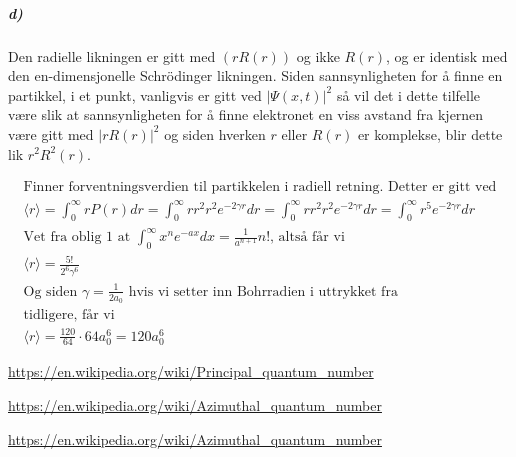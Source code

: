 \documentclass[11pt, A4paper,norsk]{article}
\begin{document}
			\subparagraph{d)}
				\begin{flushleft}
Den radielle likningen er gitt med $(r R(r))$ og ikke $R(r)$, og er identisk med den en-dimensjonelle Schrödinger likningen. Siden sannsynligheten for å finne en partikkel, i et punkt, vanligvis er gitt ved $|\Psi(x, t)|^2$ så vil det i dette tilfelle være slik at sannsynligheten for å finne elektronet en viss avstand fra kjernen være gitt med $|r R(r)|^2$ og siden hverken $r$ eller $R(r)$ er komplekse, blir dette lik $r^2 R^2(r)$.
				\end{flushleft}
				\begin{gather*}
\text{Finner forventningsverdien til partikkelen i radiell retning. Detter er gitt ved} \\
\langle r \rangle = \int_{0}^{\infty} r P(r) dr = \int_{0}^{\infty} r r^2 r^2 e^{- 2 \gamma r} dr = \int_{0}^{\infty} r r^2 r^2 e^{- 2 \gamma r} dr = \int_{0}^{\infty} r^5 e^{- 2 \gamma r} dr \\
\text{Vet fra oblig $1$ at $\int_{0}^{\infty} x^{n} e^{-ax} dx = \frac{1}{a^{n + 1}} n!$, altså får vi} \\
\langle r \rangle = \frac{5!}{2^6 \gamma^6} \\
\text{Og siden $\gamma = \frac{1}{2 a_0}$ hvis vi setter inn Bohrradien i uttrykket fra} \\
\text{tidligere, får vi} \\
\langle r \rangle = \frac{120}{64} \cdot 64 a_0^6 = 120 a_0^6  
				\end{gather*}








		\begin{thebibliography}{9}
\url{https://en.wikipedia.org/wiki/Principal_quantum_number}

\url{https://en.wikipedia.org/wiki/Azimuthal_quantum_number}

\url{https://en.wikipedia.org/wiki/Azimuthal_quantum_number}
		\end{thebibliography}
\end{document}
